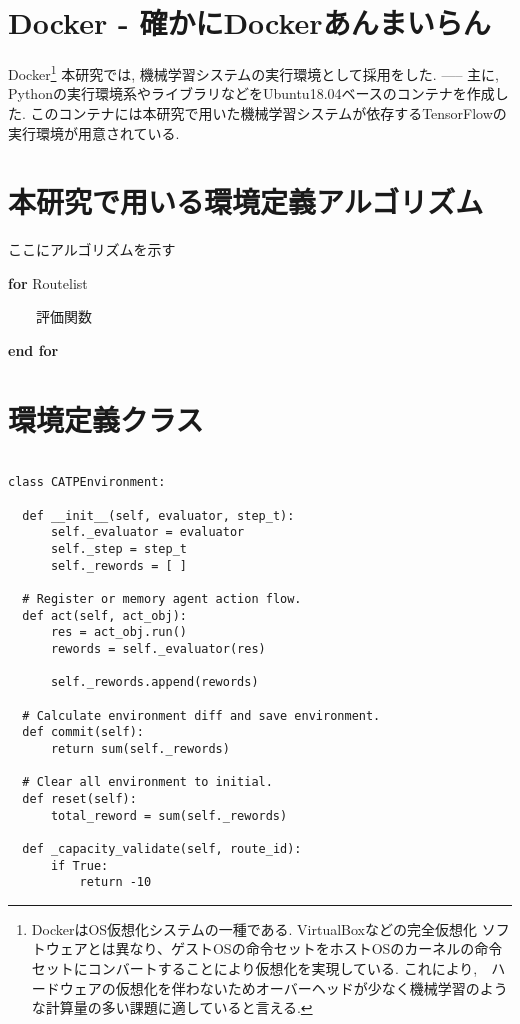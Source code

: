 \section{Docker - 確かにDockerあんまいらん}

Docker\footnote{DockerはOS仮想化システムの一種である. VirtualBoxなどの完全仮想化
ソフトウェアとは異なり、ゲストOSの命令セットをホストOSのカーネルの命令セットにコンバートすることにより仮想化を実現している.
これにより,　ハードウェアの仮想化を伴わないためオーバーヘッドが少なく機械学習のような計算量の多い課題に適していると言える.}
本研究では, 機械学習システムの実行環境として採用をした.
-----
主に, Pythonの実行環境系やライブラリなどをUbuntu18.04ベースのコンテナを作成した.
このコンテナには本研究で用いた機械学習システムが依存するTensorFlowの実行環境が用意されている.

\section{本研究で用いる環境定義アルゴリズム}

ここにアルゴリズムを示す

\textbf{for} Routelist

\ \ \ \ 評価関数

\textbf{end for}


\section{環境定義クラス}

\begin{lstlisting}[caption = 環境を構築するクラス, label = program1]

class CATPEnvironment:

  def __init__(self, evaluator, step_t):
      self._evaluator = evaluator
      self._step = step_t
      self._rewords = [ ]

  # Register or memory agent action flow.
  def act(self, act_obj):
      res = act_obj.run()
      rewords = self._evaluator(res)

      self._rewords.append(rewords)
  
  # Calculate environment diff and save environment.
  def commit(self):
      return sum(self._rewords)
  
  # Clear all environment to initial.
  def reset(self):
      total_reword = sum(self._rewords)

  def _capacity_validate(self, route_id):
      if True:
          return -10
\end{lstlisting}
  




